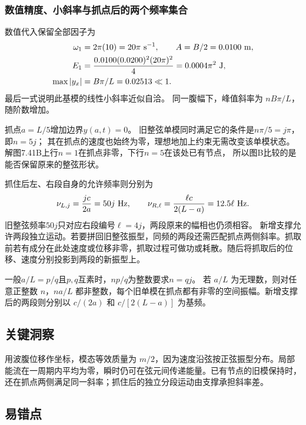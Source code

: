 \documentclass[UTF8,fontset=fandol,a4paper,11pt]{ctexart}
\begin{document}
\subsubsection*{数值精度、小斜率与抓点后的两个频率集合}
数值代入保留全部因子为
\[
\begin{aligned}
\omega_1&=2\pi(10)=20\pi\ {\rm s^{-1}},\qquad
A=B/2=0.0100\ {\rm m},\\
E_1&=\frac{0.0100(0.0200)^2(20\pi)^2}{4}
=0.0004\pi^2\ {\rm J},\\
\max|y_x|&=B\pi/L=0.02513\ll1.
\end{aligned}
\]
最后一式说明此基模的线性小斜率近似自洽。
同一腹幅下，峰值斜率为 $nB\pi/L$，随阶数增加。

抓点$a=L/5$增加边界$y(a,t)=0$。
旧整弦单模同时满足它的条件是$n\pi/5=j\pi$，即$n=5j$；
其在抓点的速度也始终为零，理想地加上约束无需改变该单模状态。
解图7.41B上行$n=1$在抓点非零，下行$n=5$在该处已有节点，
所以图B比较的是能否保留原来的整弦形状。

抓住后左、右段自身的允许频率则分别为
\[
\nu_{L,j}=\frac{jc}{2a}=50j\ {\rm Hz},\qquad
\nu_{R,\ell}=\frac{\ell c}{2(L-a)}=12.5\ell\ {\rm Hz}.
\]
旧整弦频率$50j$只对应右段编号$\ell=4j$，两段原来的幅相也仍须相容。
新增支撑允许两段独立运动。若要拼回旧整弦振型，同频的两段还需匹配抓点两侧斜率。抓取前若有成分在此处速度或位移非零，抓取过程可做功或耗散。随后将抓取后的位移、速度分别投影到两段的新振型上。

一般$a/L=p/q$且$p,q$互素时，$np/q$为整数要求$n=qj$。
若 $a/L$ 为无理数，则对任意正整数 $n$，$na/L$ 都非整数，每个旧单模在抓点都有非零的空间振幅。新增支撑后的两段则分别以 $c/(2a)$ 和 $c/[2(L-a)]$ 为基频。




\subsection*{关键洞察}

用波腹位移作坐标，模态等效质量为 $m/2$，因为速度沿弦按正弦振型分布。局部能流在一周期内平均为零，瞬时仍可在弦元间传递能量。已有节点的旧模保持时，还在抓点两侧满足同一斜率；抓住后的独立分段运动由支撑承担斜率差。




\subsection*{易错点}
\end{document}

